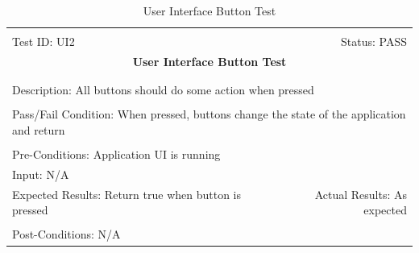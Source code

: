 \documentclass[11pt]{article}
\begin{document}
\begin{center}
\begin{table}[H]
\begin{tabular}{|l r|}\hline&\\[-2mm]
	Test ID: UI2	&Status: PASS \\[-3mm]
	\multicolumn{2}{|c|}{\textbf{\large{User Interface Button Test}}}\\&\\\hline&\\[-3mm]
	\multicolumn{2}{|p{\textwidth}|}{Description: All buttons should do some action when pressed}\\[1mm]\hline&\\[-3mm]
	\multicolumn{2}{|p{\textwidth}|}{Pass/Fail Condition: When pressed, buttons change the state of the application and return }\\[1mm]\hline&\\[-3mm]
	\multicolumn{2}{|p{\textwidth}|}{Pre-Conditions: Application UI is running}\\[4mm]
	\multicolumn{2}{|p{\textwidth}|}{Input: N/A}\\[2mm]\hline
	\multicolumn{1}{|p{0.49\textwidth}}{Expected Results: Return true when button is pressed}	&\multicolumn{1}{|p{0.45\textwidth}|}{Actual Results: As expected}\\\hline&\\[-3mm]
	\multicolumn{2}{|p{\textwidth}|}{Post-Conditions: N/A}\\\hline
\end{tabular}
\caption{User Interface Button Test}
\end{table}
\end{center}
\end{document}

